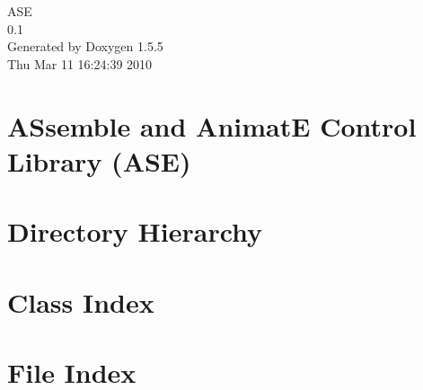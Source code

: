 \documentclass[a4paper]{book}
\begin{document}
\begin{titlepage}
\vspace*{7cm}
\begin{center}
{\Large ASE \\[1ex]\large 0.1 }\\
\vspace*{1cm}
{\large Generated by Doxygen 1.5.5}\\
\vspace*{0.5cm}
{\small Thu Mar 11 16:24:39 2010}\\
\end{center}
\end{titlepage}
\clearemptydoublepage
{}
\tableofcontents
\clearemptydoublepage
{}
\chapter{ASsemble and AnimatE Control Library (ASE) }
\label{index}\hypertarget{index}{}
\chapter{Directory Hierarchy}

\chapter{Class Index}

\chapter{File Index}

\end{document}

